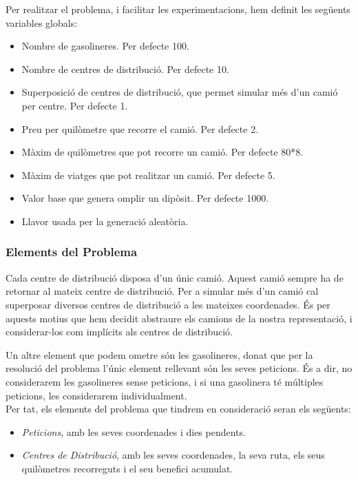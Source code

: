 \documentclass[a4paper]{article}
\begin{document}
Per realitzar el problema, i facilitar les experimentacions, hem definit les següents variables globals:
\begin{itemize}
\item Nombre de gasolineres. Per defecte 100.
\item Nombre de centres de distribució. Per defecte 10.
\item Superposició de centres de distribució, que permet simular més d'un camió per centre. Per defecte 1.
\item Preu per quilòmetre que recorre el camió. Per defecte 2.
\item Màxim de quilòmetres que pot recorre un camió. Per defecte 80*8.
\item Màxim de viatges que pot realitzar un camió. Per defecte 5.
\item Valor base que genera omplir un dipòsit. Per defecte 1000.
\item Llavor usada per la generació aleatòria.\\
\end{itemize}

\subsubsection{Elements del Problema}
Cada centre de distribució disposa d'un únic camió. Aquest camió sempre ha de retornar al mateix centre de distribució. Per a simular més d'un camió cal superposar diversos centres de distribució a les mateixes coordenades. És per aquests motius que hem decidit abstraure els camions de la nostra representació, i considerar-los com implícits als centres de distribució.\

Un altre element que podem ometre són les gasolineres, donat que per la resolució del problema l'únic element rellevant són les seves peticions. És a dir, no considerarem les gasolineres sense peticions, i si una gasolinera té múltiples peticions, les considerarem individualment.\\

Per tat, els elements del problema que tindrem en consideració seran els següents:
\begin{itemize}
\item \emph{Peticions}, amb les seves coordenades i dies pendents.
\item \emph{Centres de Distribució}, amb les seves coordenades, la seva ruta, els seus quilòmetres recorreguts i el seu benefici acumulat.\\
\end{itemize}
\end{document}
